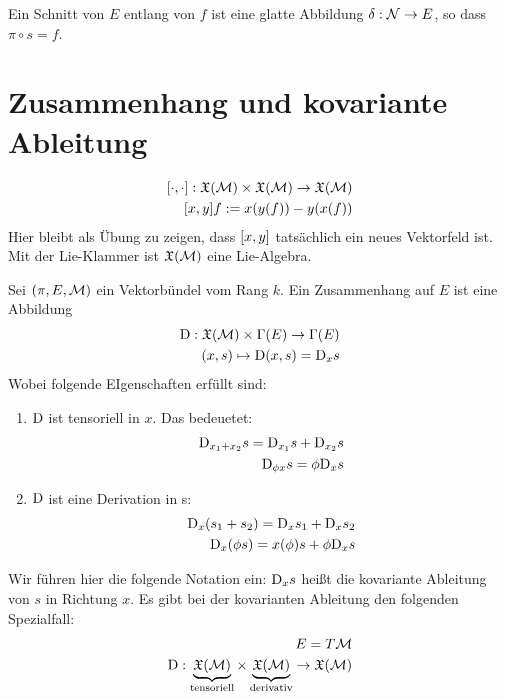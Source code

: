 \begin{defs}
Ein Schnitt von $E$ entlang von $f$ ist eine glatte Abbildung $\delta : \mathcal{N} \to E$, so dass $\pi \circ s = f$. 
\end{defs}

\section{Zusammenhang und kovariante Ableitung}

\begin{defs}
\begin{align}
\comm{\cdot}{\cdot} : \mathfrak{X}(\mfk) \times \mathfrak{X}(\mfk) \to \mathfrak{X}(\mfk)\\
\comm{x}{y} f := x(y(f)) - y(x(f))
\end{align}
Hier bleibt als Übung zu zeigen, dass $\comm{x}{y}$ tatsächlich ein neues Vektorfeld ist.
Mit der Lie-Klammer ist $\mathfrak{X}(\mathcal{M})$ eine Lie-Algebra.
\end{defs}

\begin{defs}[Zusammenhang]
Sei $(\pi, E, \mathcal{M})$ ein Vektorbündel vom Rang $k$.
Ein Zusammenhang auf $E$ ist eine Abbildung
\begin{align}
\mathrm{D} : \mathfrak{X}(\mathcal{M}) \times \Gamma(E) \to \Gamma (E) \\
(x, s) \mapsto \mathrm{D} (x, s) = \mathrm{D}_x s
\end{align}
Wobei folgende EIgenschaften erfüllt sind:
\begin{enumerate}
\item $\mathrm{D}$ ist tensoriell in $x$. 
Das bedeuetet:
\begin{align}
\mathrm{D}_{x_1 + x_2} s = \mathrm{D}_{x_1} s + \mathrm{D}_{x_2} s \\
\mathrm{D}_{\phi x} s = \phi \mathrm{D}_x s
\end{align}
\item $\mathrm{D}$ ist eine Derivation in s:
\begin{align}
\mathrm{D}_x (s_1 + s_2) = \mathrm{D}_x s_1 + \mathrm{D}_x s_2\\
\mathrm{D}_x (\phi s) = x(\phi) s + \phi \mathrm{D}_x  s
\end{align}
\end{enumerate}
\end{defs}

Wir führen hier die folgende Notation ein:
$\mathrm{D}_x s$ heißt die kovariante Ableitung von $s$ in Richtung $x$.
Es gibt bei der kovarianten Ableitung den folgenden Spezialfall:
\begin{align}
E = T\mathcal{M}\\
\mathrm{D}: \underbrace{\mathfrak{X}(\mathcal{M})}_{\mathrm{tensoriell}} \times \underbrace{\mathfrak{X}(\mathcal{M})}_{\mathrm{derivativ}} \to \mathfrak{X}(\mathcal{M})
\end{align}

